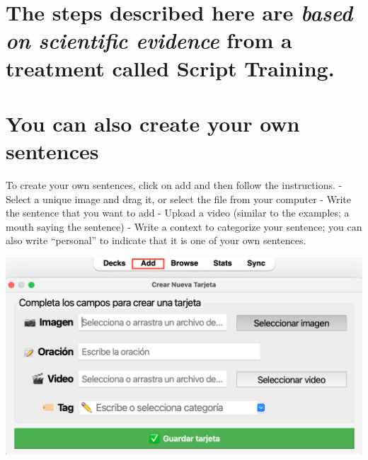 \documentclass[
]{book}
\begin{document}
\section{\texorpdfstring{The steps described here are \emph{based on scientific evidence} from a treatment called Script Training.}{The steps described here are based on scientific evidence from a treatment called Script Training.}}\label{the-steps-described-here-are-based-on-scientific-evidence-from-a-treatment-called-script-training.}

\section{You can also create your own sentences}\label{you-can-also-create-your-own-sentences}

To create your own sentences, click on add and then follow the instructions.
- Select a unique image and drag it, or select the file from your computer
- Write the sentence that you want to add
- Upload a video (similar to the examples; a mouth saying the sentence)
- Write a context to categorize your sentence; you can also write ``personal'' to indicate that it is one of your own sentences.

\includegraphics[width=0.9\linewidth]{images/reposit_en/nuevas}

  
\end{document}
